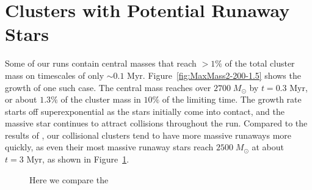 \documentclass{princeton_astro_thesis}
\newcommand\Msun{\; M_\odot}
\newcommand\msun{\; M_\odot}
\newcommand\Myr{\mbox{ Myr}}
\numberwithin{equation}{section}
\begin{document}
\section{Clusters with Potential Runaway Stars}
Some of our runs contain central masses that reach $> 1\%$ of the total cluster mass on timescales of only $\sim 0.1 \Myr$.  Figure~\ref{fig:MaxMass2-200-1.5} shows the growth of one such case. The central mass reaches over $2700 \Msun$ by $t = 0.3 \Myr$, or about $1.3 \%$ of the cluster mass in $10\%$ of the limiting time. The growth rate starts off superexponential as the stars initially come into contact, and the massive star continues to attract collisions throughout the run.  Compared to the results of \citet{2004SPZ}, our collisional clusters tend to have more massive runaways more quickly, as even their most massive runaway stars reach $2500 \msun$ at about $t = 3 \Myr$, as shown in Figure~\ref{fig:CompareGrowth}.
\begin{figure}%
    \centering
    \qquad   
    \caption{Here we compare the }
    \label{fig:CompareGrowth}
\end{figure}
\end{document}
